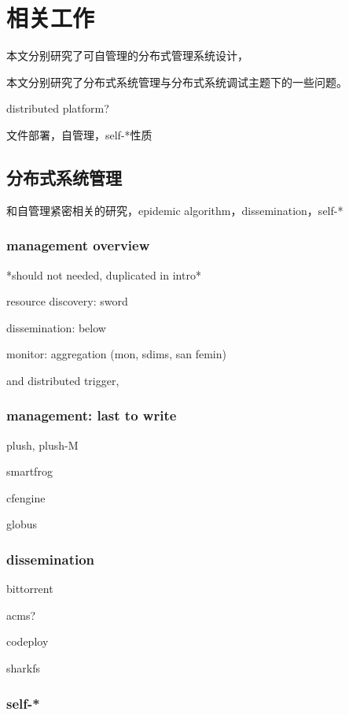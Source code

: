 \chapter{相关工作}
\label{chap:related}

本文分别研究了可自管理的分布式管理系统设计，

本文分别研究了分布式系统管理与分布式系统调试主题下的一些问题。

distributed platform?

文件部署，自管理，self-*性质


\section{分布式系统管理}

和自管理紧密相关的研究，epidemic algorithm，dissemination，self-*

\subsection{management overview}

*should not needed, duplicated in intro*

resource discovery: sword

dissemination: below

monitor: aggregation (mon, sdims, san femin)

and distributed trigger, 

\subsection{management: last to write}

plush, plush-M

smartfrog

cfengine

globus

\subsection{dissemination}

bittorrent

acms?

codeploy

sharkfs

\subsection{self-*}

